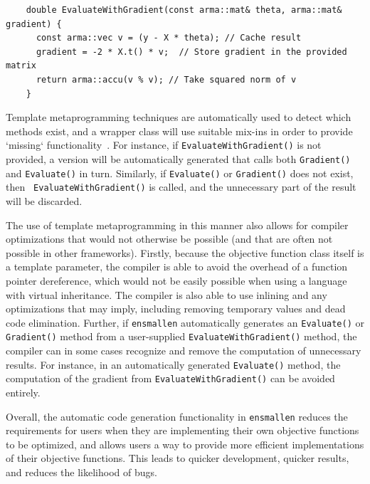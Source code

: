 \documentclass{article}
\begin{document}
\begin{adjustbox}{scale={0.95}{0.95}}
\begin{minipage}{1\textwidth}
\begin{verbatim}
    double EvaluateWithGradient(const arma::mat& theta, arma::mat& gradient) {
      const arma::vec v = (y - X * theta); // Cache result
      gradient = -2 * X.t() * v;  // Store gradient in the provided matrix
      return arma::accu(v % v); // Take squared norm of v
    }
\end{verbatim}
\end{minipage}
\end{adjustbox}

Template metaprogramming techniques are automatically used to
detect which methods exist, and a wrapper class will use suitable mix-ins in
order to provide `missing` functionality~\cite{smaragdakis2000mixin}.  For
instance, if \texttt{\small EvaluateWithGradient()} is not provided, a version will be
automatically generated that calls both \texttt{\small Gradient()} and \texttt{\small Evaluate()} in turn.
Similarly, if \texttt{\small Evaluate()} or \texttt{\small Gradient()} does not exist, then {\tt
EvaluateWithGradient()} is called, and the unnecessary part of the result will
be discarded.

The use of template metaprogramming in this manner also allows for compiler optimizations that
would not otherwise be possible (and that are often not possible in other
frameworks).  Firstly, because the objective function class itself is a template
parameter, the compiler is able to avoid the overhead of a function pointer
dereference, which would not be easily possible when using a language with
virtual inheritance.  The compiler is also able to use inlining and any
optimizations that may imply, including removing temporary values and dead code
elimination.  Further, if {\tt ensmallen} automatically generates an
\texttt{\small Evaluate()} or \texttt{\small Gradient()} method from a user-supplied
\texttt{\small EvaluateWithGradient()} method, the compiler can in some cases recognize and
remove the computation of unnecessary results.  For instance, in an
automatically generated \texttt{\small Evaluate()} method, the computation of the gradient
from \texttt{\small EvaluateWithGradient()} can be avoided entirely.

Overall, the automatic code generation functionality in {\tt ensmallen}
reduces the requirements for users
when they are implementing their own objective functions to be optimized,
and allows users a way to provide more efficient implementations of their
objective functions.
This leads to quicker development, quicker results, and reduces the likelihood of bugs.
\end{document}
